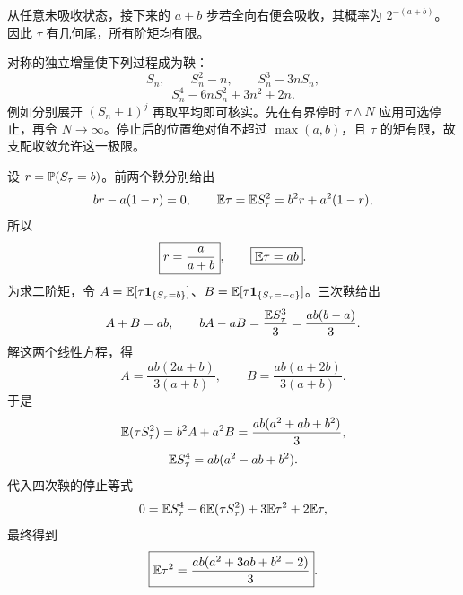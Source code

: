 从任意未吸收状态，接下来的 $a+b$ 步若全向右便会吸收，其概率为 $2^{-(a+b)}$。因此 $\tau$ 有几何尾，所有阶矩均有限。

对称的独立增量使下列过程成为鞅：
\[
 S_n,\qquad S_n^2-n,\qquad S_n^3-3nS_n,
\]
\[
 S_n^4-6nS_n^2+3n^2+2n.
\]
例如分别展开 $(S_n\pm1)^j$ 再取平均即可核实。先在有界停时 $\tau\wedge N$ 应用可选停止，再令 $N\to\infty$。停止后的位置绝对值不超过 $\max(a,b)$，且 $\tau$ 的矩有限，故支配收敛允许这一极限。

设 $r=\mathbb{P}(S_\tau=b)$。前两个鞅分别给出
\[
 br-a(1-r)=0,\qquad
 \mathbb{E}\tau=\mathbb{E} S_\tau^2=b^2r+a^2(1-r),
\]
所以
\[
 \boxed{r=\frac a{a+b}},\qquad \boxed{\mathbb{E}\tau=ab}.
\]
为求二阶矩，令 $A=\mathbb{E}[\tau\mathbf{1}_{\{S_\tau=b\}}]$、$B=\mathbb{E}[\tau\mathbf{1}_{\{S_\tau=-a\}}]$。三次鞅给出
\[
 A+B=ab,\qquad
 bA-aB=\frac{\mathbb{E} S_\tau^3}{3}=\frac{ab(b-a)}3.
\]
解这两个线性方程，得
\[
 A=\frac{ab(2a+b)}{3(a+b)},\qquad
 B=\frac{ab(a+2b)}{3(a+b)}.
\]
于是
\[
 \mathbb{E}(\tau S_\tau^2)=b^2A+a^2B
       =\frac{ab(a^2+ab+b^2)}3,
\]
\[
 \mathbb{E} S_\tau^4=ab(a^2-ab+b^2).
\]
代入四次鞅的停止等式
\[
 0=\mathbb{E} S_\tau^4-6\mathbb{E}(\tau S_\tau^2)
       +3\mathbb{E}\tau^2+2\mathbb{E}\tau,
\]
最终得到
\[
 \boxed{\mathbb{E}\tau^2=\frac{ab(a^2+3ab+b^2-2)}3}.
\]
